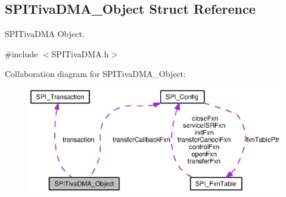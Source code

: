 \subsection{S\-P\-I\-Tiva\-D\-M\-A\-\_\-\-Object Struct Reference}
\label{struct_s_p_i_tiva_d_m_a___object}


S\-P\-I\-Tiva\-D\-M\-A Object.  




{\ttfamily \#include $<$S\-P\-I\-Tiva\-D\-M\-A.\-h$>$}



Collaboration diagram for S\-P\-I\-Tiva\-D\-M\-A\-\_\-\-Object\-:
\nopagebreak
\begin{figure}[H]
\begin{center}
\leavevmode
\includegraphics[width=350pt]{struct_s_p_i_tiva_d_m_a___object__coll__graph}
\end{center}
\end{figure}
